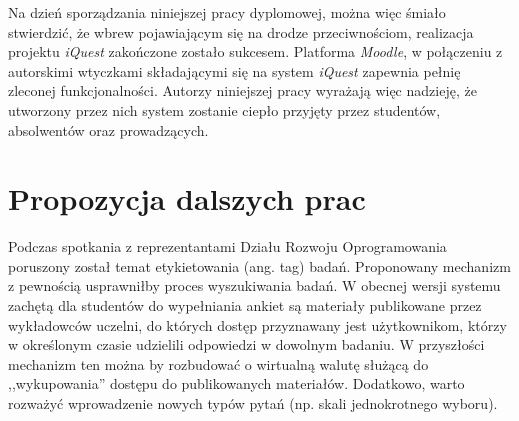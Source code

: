 Na dzień sporządzania niniejszej pracy dyplomowej, można więc śmiało stwierdzić, że wbrew pojawiającym się na drodze przeciwnościom, realizacja projektu \textit{iQuest} zakończone zostało sukcesem. Platforma \textit{Moodle}, w połączeniu z autorskimi wtyczkami składającymi się na system \textit{iQuest} zapewnia pełnię zleconej funkcjonalności. Autorzy niniejszej pracy wyrażają więc nadzieję, że utworzony przez nich system zostanie ciepło przyjęty przez studentów, absolwentów oraz prowadzących.

\section{Propozycja dalszych prac}
\label{Chapter92}

Podczas spotkania z reprezentantami Działu Rozwoju Oprogramowania poruszony został temat etykietowania (ang. tag) badań. Proponowany mechanizm z pewnością usprawniłby proces wyszukiwania badań. W obecnej wersji systemu zachętą dla studentów do wypełniania ankiet są materiały publikowane przez wykładowców uczelni, do których dostęp przyznawany jest użytkownikom, którzy w określonym czasie udzielili odpowiedzi w dowolnym badaniu. W przyszłości mechanizm ten można by rozbudować o wirtualną walutę służącą do ,,wykupowania'' dostępu do publikowanych materiałów. Dodatkowo, warto rozważyć wprowadzenie nowych typów pytań (np. skali jednokrotnego wyboru).